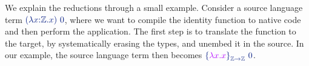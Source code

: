 We explain the reductions through a small example. Consider a source language term
$\sapp{\source{(}\sabs{\svar{x}}{\mathbb{\source{Z}}}{\svar{x}}\source{)}}{\source{0}}$, where we want to compile the
identity function to native code and then perform the application. The
first step is to translate the function to the target, by systematically
erasing the types, and unembed it in the source. In our example, the
source language term then becomes
$\sapp{\salien{\tabs{\tvar{x}}{\tvar{x}}}{\mathbb{\source{Z}} \source{->} \mathbb{\source{Z}}}{}}{\source{0}}$.






%

